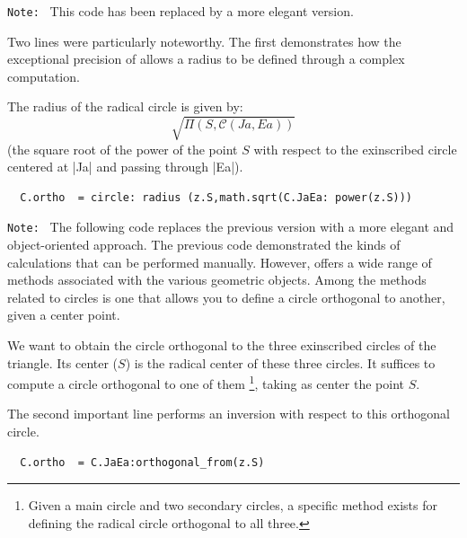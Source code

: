 \begin{tcolorbox}[
  title=Deprecated Code,
  colframe=red!50,
  colback=red!5,
  coltitle=black,
  sharp corners,
  fonttitle=\bfseries,
  leftrule=1mm,
  rightrule=1mm,
  toprule=0.5mm,
  bottomrule=0.5mm
]
\texttt{Note: } This code has been replaced by a more elegant version.

Two lines were particularly noteworthy. The first demonstrates how the exceptional precision of  allows a radius to be defined through a complex computation.

The radius of the radical circle is given by:
\[
\sqrt{\Pi(S,\mathcal{C}(Ja,Ea))}
\]
(the square root of the power of the point $S$ with respect to the exinscribed circle centered at |Ja| and passing through |Ea|).

\begin{mybox}{}
\begin{verbatim}
  C.ortho  = circle: radius (z.S,math.sqrt(C.JaEa: power(z.S)))
\end{verbatim}
\end{mybox}
\end{tcolorbox}

\begin{tcolorbox}[
  title=Revised Code,
  colframe=cyan!60!black,
  colback=cyan!5,
  coltitle=white,
  sharp corners,
  fonttitle=\bfseries,
  leftrule=1mm,
  rightrule=1mm,
  toprule=0.5mm,
  bottomrule=0.5mm
]
\texttt{Note: } The following code replaces the previous version with a more elegant and object-oriented approach.
The previous code demonstrated the kinds of calculations that can be performed manually. However,  offers a wide range of methods associated with the various geometric objects. Among the methods related to circles is one that allows you to define a circle orthogonal to another, given a center point.

We want to obtain the circle orthogonal to the three exinscribed circles of the triangle. Its center ($S$) is the radical center of these three circles. It suffices to compute a circle orthogonal to one of them \footnote{Given a main circle and two secondary circles, a specific method exists for defining the radical circle orthogonal to all three.}, taking as center the point $S$.

The second important line performs an inversion with respect to this orthogonal circle.

\begin{mybox}{}
\begin{verbatim}
  C.ortho  = C.JaEa:orthogonal_from(z.S)
\end{verbatim}
\end{mybox}
\end{tcolorbox}

